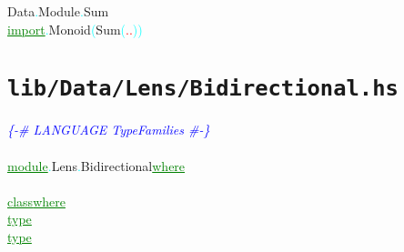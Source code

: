 {\rm{}Data}\textcolor{cyan}{.}{\rm{}Module}\textcolor{cyan}{.}{\rm{}Sum}\\\textcolor{green}{\underline{import}}\textcolor{cyan}{.}{\rm{}Monoid}\hsspace \textcolor{cyan}{(}{\rm{}Sum}\textcolor{cyan}{(}\textcolor{red}{..}\textcolor{cyan}{)}\textcolor{cyan}{)}\\
\section{\texttt{lib/Data/Lens/Bidirectional.hs}}
\label{mod:Data.Lens.Bidirectional}
\textcolor{blue}{{\it{}\{-\# LANGUAGE TypeFamilies \#-\}}}\\\\\textcolor{green}{\underline{module}}\textcolor{cyan}{.}{\rm{}Lens}\textcolor{cyan}{.}{\rm{}Bidirectional}\hsspace \textcolor{green}{\underline{where}}\\\\\textcolor{green}{\underline{class}}\hsspace \textcolor{green}{\underline{where}}\\\hstab \textcolor{green}{\underline{type}}\\\hstab \textcolor{green}{\underline{type}}\\
